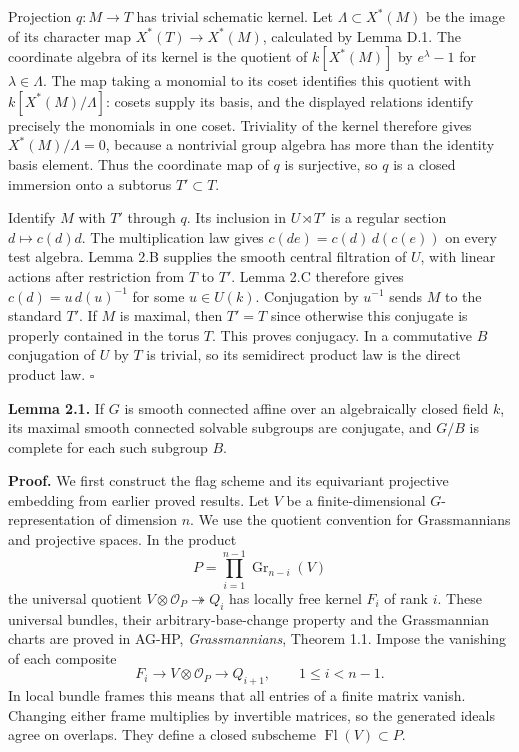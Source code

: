 \documentclass[11pt,a4paper,openany]{report}
\begin{document}
Projection \(q:M\to T\) has trivial schematic kernel. Let \(\Lambda\subset X^*(M)\) be the image of its character map \(X^*(T)\to X^*(M)\), calculated by Lemma D.1. The coordinate algebra of its kernel is the quotient of \(k[X^*(M)]\) by \(e^\lambda-1\) for \(\lambda\in\Lambda\). The map taking a monomial to its coset identifies this quotient with \(k[X^*(M)/\Lambda]\): cosets supply its basis, and the displayed relations identify precisely the monomials in one coset. Triviality of the kernel therefore gives \(X^*(M)/\Lambda=0\), because a nontrivial group algebra has more than the identity basis element. Thus the coordinate map of \(q\) is surjective, so \(q\) is a closed immersion onto a subtorus \(T'\subset T\).

Identify \(M\) with \(T'\) through \(q\). Its inclusion in \(U\rtimes T'\) is a regular section \(d\mapsto c(d)d\). The multiplication law gives \(c(de)=c(d)\,d(c(e))\) on every test algebra. Lemma 2.B supplies the smooth central filtration of \(U\), with linear actions after restriction from \(T\) to \(T'\). Lemma 2.C therefore gives \(c(d)=u\,d(u)^{-1}\) for some \(u\in U(k)\). Conjugation by \(u^{-1}\) sends \(M\) to the standard \(T'\). If \(M\) is maximal, then \(T'=T\) since otherwise this conjugate is properly contained in the torus \(T\). This proves conjugacy. In a commutative \(B\) conjugation of \(U\) by \(T\) is trivial, so its semidirect product law is the direct product law. \(\square\)

\textbf{Lemma 2.1.} If \(G\) is smooth connected affine over an algebraically closed field \(k\), its maximal smooth connected solvable subgroups are conjugate, and \(G/B\) is complete for each such subgroup \(B\).

\textbf{Proof.} We first construct the flag scheme and its equivariant projective embedding from earlier proved results. Let \(V\) be a finite-dimensional \(G\)-representation of dimension \(n\). We use the quotient convention for Grassmannians and projective spaces. In the product \[
 P=\prod_{i=1}^{n-1}\operatorname{Gr}_{n-i}(V)
\] the universal quotient \(V\otimes\mathcal O_P\twoheadrightarrow Q_i\) has locally free kernel \(F_i\) of rank \(i\). These universal bundles, their arbitrary-base-change property and the Grassmannian charts are proved in AG-HP, \emph{Grassmannians}, Theorem 1.1. Impose the vanishing of each composite \[
 F_i\longrightarrow V\otimes\mathcal O_P\longrightarrow Q_{i+1},
              \qquad 1\le i<n-1.
\] In local bundle frames this means that all entries of a finite matrix vanish. Changing either frame multiplies by invertible matrices, so the generated ideals agree on overlaps. They define a closed subscheme \(\operatorname{Fl}(V)\subset P\).
\end{document}
